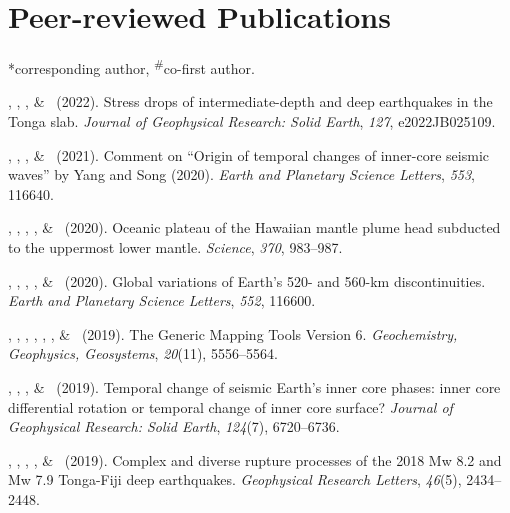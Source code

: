 \section{Peer-reviewed Publications}
\newcommand{\Revision}{\emph{under revision}}
\newcommand{\CS}{*} %
\newcommand{\CF}{\textsuperscript{\#}} %

\CS corresponding author, \CF co-first author.
\begin{etaremune}
\item \Me\CS, \SWei\CS, \WWang, \& \FWang\ (2022).
    Stress drops of intermediate-depth and deep earthquakes in the Tonga slab.
    \emph{Journal of Geophysical Research: Solid Earth}, \emph{127}, e2022JB025109.
\item \JYao\CS, \Me, \LSun, \& \LWen\ (2021).
    Comment on ``Origin of temporal changes of inner-core seismic waves'' by Yang and Song (2020).
    \emph{Earth and Planetary Science Letters}, \emph{553}, 116640.
\item \SWei\CS, \PShearer, \CLithgowBertelloni, \LStixrude, \& \Me\ (2020).
    Oceanic plateau of the Hawaiian mantle plume head subducted to the uppermost lower mantle.
    \emph{Science}, \emph{370}, 983--987.
\item \Me\CS, \MLv, \SWei, \SDorfman, \& \PShearer\ (2020).
    Global variations of Earth's 520- and 560-km discontinuities.
    \emph{Earth and Planetary Science Letters}, \emph{552}, 116600. \\
\item
    \PWessel\CS, \JLuis, \LUieda, \RScharroo, \FWobbe, \WSmith, \& \Me\ (2019).
    The Generic Mapping Tools Version 6.
    \emph{Geochemistry, Geophysics, Geosystems}, \emph{20}(11), 5556--5564.
\item
    \JYao\CS, \Me, \LSun, \& \LWen\ (2019).
    Temporal change of seismic Earth's inner core phases: inner core differential rotation or temporal change of inner core surface?
    \emph{Journal of Geophysical Research: Solid Earth}, \emph{124}(7), 6720--6736.
\item
    \WFan\CS, \SWei, \Me, \JMcGurie, \& \DWiens\ (2019).
    Complex and diverse rupture processes of the 2018 Mw 8.2 and Mw 7.9 Tonga-Fiji deep earthquakes.
    \emph{Geophysical Research Letters}, \emph{46}(5), 2434--2448.

\end{etaremune}
